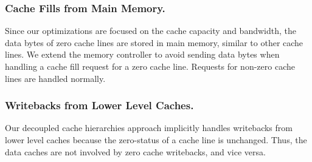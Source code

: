 \subsubsection{Cache Fills from Main Memory.} 

Since our optimizations are focused on the cache capacity and bandwidth, the data bytes of zero cache lines are stored in main memory, similar to other cache lines.  We extend the memory controller to avoid sending data bytes when handling a cache fill request for a zero cache line.  Requests for non-zero cache lines are handled normally. 

\subsubsection{Writebacks from Lower Level Caches.}

Our decoupled cache hierarchies approach implicitly handles writebacks from lower level caches because the zero-status of a cache line is unchanged.  Thus, the data caches are not involved by zero cache writebacks, and vice versa.   


